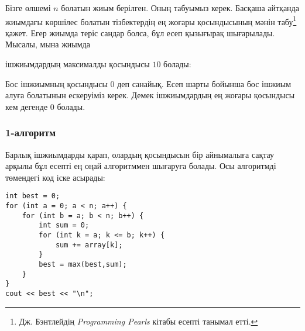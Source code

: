 Бізге өлшемі $n$ болатын жиым берілген.
Оның 
табуымыз керек. Басқаша айтқанда 
жиымдағы көршілес болатын тізбектердің
ең жоғары қосындысының мәнін табу\footnote{Дж. Бэнтлейдің \emph{Programming Pearls} \cite{ben86} кітабы есепті танымал етті.} қажет.
Егер жиымда теріс сандар болса, бұл есеп
қызығырақ шығарылады. Мысалы, мына жиымда
\begin{center}
\end{center}
\begin{samepage}
ішжиымдардың максималды қосындысы $10$ болады:
\begin{center}
\end{center}
\end{samepage}

Бос ішжиымның қосындысы $0$ деп санайық.
Есеп шарты бойынша бос ішжиым алуға болатынын ескеруіміз керек. Демек ішжиымдардың ең жоғары қосындысы кем 
дегенде $0$ болады.

\subsubsection{1-алгоритм}

Барлық ішжиымдарды қарап, олардың қосындысын
бір айнымалыға сақтау арқылы бұл есепті ең оңай алгоритммен шығаруға болады.
Осы алгоритмді төмендегі код іске асырады:

\begin{lstlisting}
int best = 0;
for (int a = 0; a < n; a++) {
    for (int b = a; b < n; b++) {
        int sum = 0;
        for (int k = a; k <= b; k++) {
            sum += array[k];
        }
        best = max(best,sum);
    }
}
cout << best << "\n";
\end{lstlisting}

